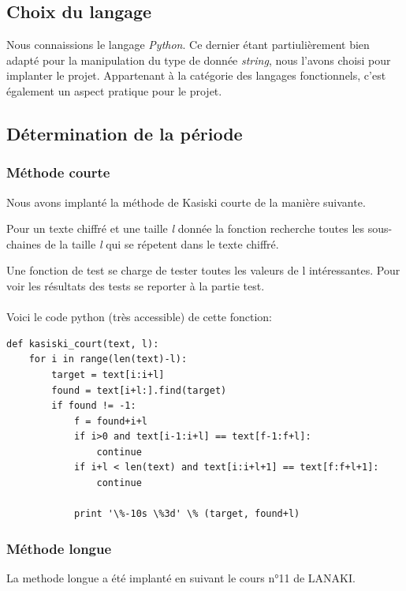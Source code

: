 \documentclass[a4paper, 11pt]{article}
\begin{document}
\subsection{Choix du langage}
Nous connaissions le langage \textit{Python}.
Ce dernier étant partiulièrement bien adapté pour la manipulation
du type de donnée \textit{string}, nous l'avons choisi pour implanter
le projet.
Appartenant à la catégorie des langages fonctionnels, c'est également
un aspect pratique pour le projet.

\subsection{Détermination de la période}

\subsubsection{Méthode courte}
Nous avons implanté la méthode de Kasiski courte de la manière
suivante.

Pour un texte chiffré et une taille \textit{l} donnée la fonction recherche toutes
les sous-chaines de la taille \textit{l} qui se répetent dans le texte
chiffré.

Une fonction de test se charge de tester toutes les valeurs de l
intéressantes.
Pour voir les résultats des tests se reporter à la partie test.

\paragraph{}
Voici le code python (très accessible) de cette fonction:
\newpage
\begin{lstlisting}
def kasiski_court(text, l):
    for i in range(len(text)-l):
        target = text[i:i+l]
        found = text[i+l:].find(target)
        if found != -1:
            f = found+i+l
            if i>0 and text[i-1:i+l] == text[f-1:f+l]:
                continue
            if i+l < len(text) and text[i:i+l+1] == text[f:f+l+1]:
                continue            

            print '\%-10s \%3d' \% (target, found+l)
\end{lstlisting}


\subsubsection{Méthode longue}
La methode longue a été implanté en suivant le cours n°11 de LANAKI.
\end{document}
